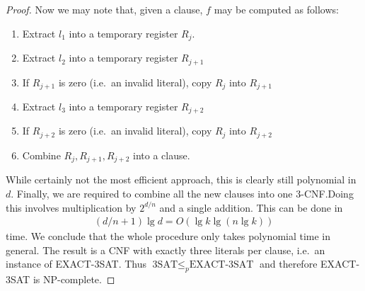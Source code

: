 \documentclass{article}
\begin{document}
\begin{claim*}[a]
\begin{proof}
		Now we may note that, given a clause, $f$ may be computed as follows:
		\begin{enumerate}[label=F\arabic*]
			\item Extract $l_1$ into a temporary register $R_{j}$.
			\item Extract $l_2$ into a temporary register $R_{j+1}$
			\item If $R_{j+1}$ is zero (i.e.\ an invalid literal), copy $R_j$ into $R_{j+1}$
			\item Extract $l_3$ into a temporary register $R_{j+2}$
			\item If $R_{j+2}$ is zero (i.e.\ an invalid literal), copy $R_j$ into $R_{j+2}$
			\item Combine $R_j,R_{j+1},R_{j+2}$ into a clause.
		\end{enumerate}
		While certainly not the most efficient approach, this is clearly still polynomial in $d$.
		Finally, we are required to combine all the new clauses into one 3-CNF.\@ Doing this involves
		multiplication by $2^{d/n}$ and a single addition. This can be done in
		\begin{align*}
			(d/n+1)\lg d=O(\lg k\lg (n\lg k))
		\end{align*}
		time. We conclude that the whole procedure only takes polynomial time in general.
		The result is a CNF with exactly three literals per clause, i.e.\ an instance of EXACT-3SAT.\@
		Thus $\text{3SAT}\leq_p\text{EXACT-3SAT}$ and therefore EXACT-3SAT is NP-complete.
	\end{proof}
\end{claim*}
\end{document}
